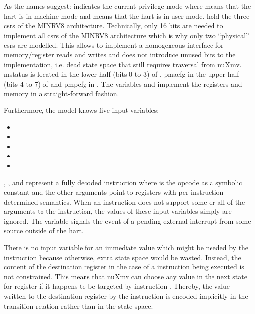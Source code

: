 As the names suggest:  indicates the current privilege mode where  means that the \gls{hart} is in machine-mode and  means that the \gls{hart} is in user-mode.
 hold the three \glspl{csr} of the MINRV8 architecture.
Technically, only 16 bits are needed to implement all \glspl{csr} of the MINRV8 architecture which is why only two \enquote{physical} \glspl{csr} are modelled.
This allows to implement a homogeneous interface for memory/register reads and writes and does not introduce unused bits to the implementation, i.e. dead state space that still requires traversal from nuXmv.
\gls{mstatus} is located in the lower half (bits 0 to 3) of , \gls{pmacfg} in the upper half (bits 4 to 7) of  and \gls{pmpcfg} in .
The variables  and  implement the registers and memory in a straight-forward fashion.

Furthermore, the model knows five input variables:
\begin{itemize}
    \item {}
    \item {}
    \item {}
    \item {}
    \item {}
\end{itemize}

, ,  and  represent a fully decoded instruction where  is the opcode as a symbolic constant and the other arguments point to registers with per-instruction determined semantics.
When an instruction does not support some or all of the arguments to the instruction, the values of these input variables simply are ignored.
The variable  signals the event of a pending external interrupt from some source outside of the \gls{hart}.

There is no input variable for an immediate value which might be needed by the  instruction because otherwise, extra state space would be wasted.
Instead, the content of the destination register in the case of a  instruction being executed is not constrained.
This means that nuXmv can choose any value in the next state for register  if it happens to be targeted by instruction .
Thereby, the value written to the destination register by the  instruction is encoded implicitly in the transition relation rather than in the state space.

